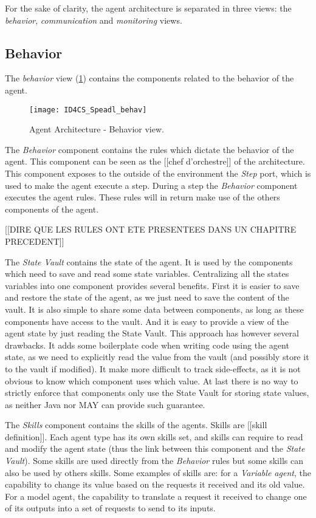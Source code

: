 For the sake of clarity, the agent architecture is separated in three views: the \emph{behavior}, \emph{communication} and \emph{monitoring} views.

\subsection{Behavior}

The \emph{behavior} view (\figurename \ref{Arch-behavior}) contains the components related to the behavior of the agent. 

\begin{figure}
\centering
\texttt{[image: ID4CS\_Speadl\_behav]}
\caption{Agent Architecture - Behavior view.}
\label{Arch-behavior}
\end{figure}

The \emph{Behavior} component contains the rules which dictate the behavior of the agent. This component can be seen as the [[chef d'orchestre]] of the architecture. This component exposes to the outside of the environment the \emph{Step} port, which is used to make the agent execute a step. During a step the \emph{Behavior} component executes the agent rules. These rules will in return make use of the others components of the agent.

[[DIRE QUE LES RULES ONT ETE PRESENTEES DANS UN CHAPITRE PRECEDENT]]

The \emph{State Vault} contains the state of the agent. It is used by the components which need to save and read some state variables. Centralizing all the states variables into one component provides several benefits. First it is easier to save and restore the state of the agent, as we just need to save the content of the vault. It is also simple to share some data between components, as long as these components have access to the vault. And it is easy to provide a view of the agent state by just reading the State Vault.
This approach has however several drawbacks. It adds some boilerplate code when writing code using the agent state, as we need to explicitly read the value from the vault (and possibly store it to the vault if modified). It make more difficult to track side-effects, as it is not obvious to know which component uses which value. At last there is no way to strictly enforce that components only use the State Vault for storing state values, as neither Java nor MAY can provide such guarantee.

The \emph{Skills} component contains the skills of the agents. Skills are [[skill definition]]. Each agent type has its own skills set, and skills can require to read and modify the agent state (thus the link between this component and the \emph{State Vault}).
Some skills are used directly from the \emph{Behavior} rules but some skills can also be used by others skills.
Some examples of skills are: for a \emph{Variable agent}, the capability to change its value based on the requests it received and its old value. For a model agent, the capability to translate a request it received to change one of its outputs into a set of requests to send to its inputs.

